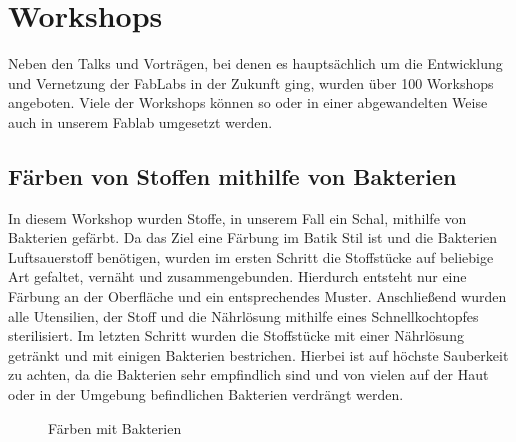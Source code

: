 \documentclass{\basedir/fablab-document}
\begin{document}
\section*{Workshops}

Neben den Talks und Vorträgen, bei denen es hauptsächlich um die
Entwicklung und Vernetzung der FabLabs in der Zukunft ging, wurden über
100 Workshops angeboten. Viele der Workshops können so oder in einer
abgewandelten Weise auch in unserem Fablab umgesetzt werden.

\subsection*{Färben von Stoffen mithilfe von Bakterien}

In diesem Workshop wurden Stoffe, in unserem Fall ein Schal, mithilfe
von Bakterien gefärbt. Da das Ziel eine Färbung im Batik Stil ist und
die Bakterien Luftsauerstoff benötigen, wurden im ersten Schritt die
Stoffstücke auf beliebige Art gefaltet, vernäht und zusammengebunden.
Hierdurch entsteht nur eine Färbung an der Oberfläche und ein
entsprechendes Muster. Anschließend wurden alle Utensilien, der Stoff
und die Nährlösung mithilfe eines Schnellkochtopfes sterilisiert. Im
letzten Schritt wurden die Stoffstücke mit einer Nährlösung getränkt und
mit einigen Bakterien bestrichen. Hierbei ist auf höchste Sauberkeit zu
achten, da die Bakterien sehr empfindlich sind und von vielen auf der
Haut oder in der Umgebung befindlichen Bakterien verdrängt werden.

\begin{figure}[htbp]
	\noindent{}
	\caption{Färben mit Bakterien}
	\label{faerben-von-stoffen-mithilfe-von-bakterien}
\end{figure}
\end{document}
